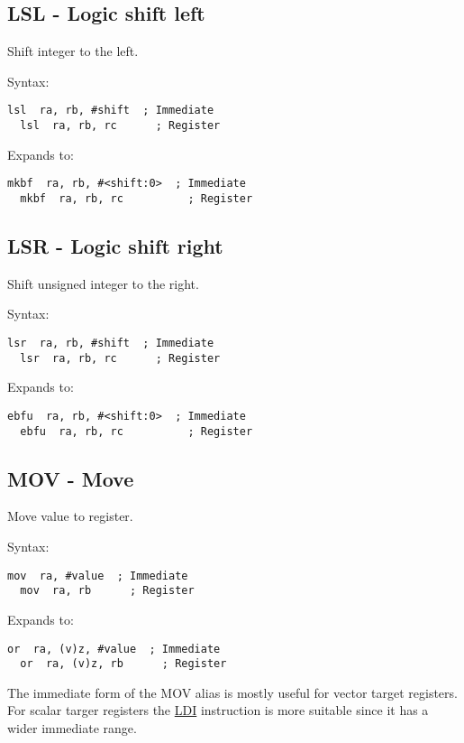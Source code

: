 \subsection{LSL - Logic shift left}

Shift integer to the left.

Syntax:
\begin{lstlisting}[style=assembler]
  lsl  ra, rb, #shift  ; Immediate
  lsl  ra, rb, rc      ; Register
\end{lstlisting}

Expands to:
\begin{lstlisting}[style=assembler]
  mkbf  ra, rb, #<shift:0>  ; Immediate
  mkbf  ra, rb, rc          ; Register
\end{lstlisting}

\subsection{LSR - Logic shift right}

Shift unsigned integer to the right.

Syntax:
\begin{lstlisting}[style=assembler]
  lsr  ra, rb, #shift  ; Immediate
  lsr  ra, rb, rc      ; Register
\end{lstlisting}

Expands to:
\begin{lstlisting}[style=assembler]
  ebfu  ra, rb, #<shift:0>  ; Immediate
  ebfu  ra, rb, rc          ; Register
\end{lstlisting}

\subsection{MOV - Move}

Move value to register.

Syntax:
\begin{lstlisting}[style=assembler]
  mov  ra, #value  ; Immediate
  mov  ra, rb      ; Register
\end{lstlisting}

Expands to:
\begin{lstlisting}[style=assembler]
  or  ra, (v)z, #value  ; Immediate
  or  ra, (v)z, rb      ; Register
\end{lstlisting}

\begin{notebox}
The immediate form of the MOV alias is mostly useful for vector target
registers. For scalar targer registers the \hyperref[insn:LDI]{LDI} instruction
is more suitable since it has a wider immediate range.
\end{notebox}

